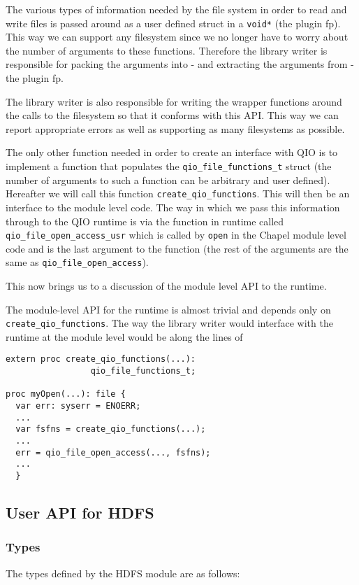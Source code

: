 The various types of information needed by the file system in order to read and write
files is passed around as a user defined struct in a {\tt void*} (the plugin fp). This way we can support
any filesystem since we no longer have to worry about the number of
arguments to these functions. Therefore the library writer is responsible for packing
the arguments into - and extracting the arguments from - the plugin fp. 

The library writer is also responsible for writing the wrapper functions
around the calls to the filesystem so that it conforms with this API.
This way we can report appropriate errors as well as supporting as many
filesystems as possible.

The only other function needed in order to create an interface with QIO is to
implement a function that populates the {\tt qio\_file\_functions\_t} struct (the number of
arguments to such a function can be arbitrary and user defined). Hereafter we will
call this function {\tt create\_qio\_functions}. This will then be an
interface to the module level code. The way in which we pass this information through to the QIO runtime is via the function
in runtime called {\tt qio\_file\_open\_access\_usr} which is called by {\tt open} in the Chapel
module level code and is the last argument to the function
(the rest of the arguments are the same as {\tt qio\_file\_open\_access}). 

This now brings us to a discussion of the module level API to the runtime.

The module-level API for the runtime is almost trivial and depends only on
{\tt create\_qio\_functions}. The way the library writer would interface with the runtime 
at the module level would be along the lines of 
\begin{lstlisting}
extern proc create_qio_functions(...):
                 qio_file_functions_t;

proc myOpen(...): file {
  var err: syserr = ENOERR;
  ...
  var fsfns = create_qio_functions(...);
  ...
  err = qio_file_open_access(..., fsfns);
  ...
  }
\end{lstlisting}

\subsection{User API for HDFS}
\subsubsection{Types}
The types defined by the HDFS module are as follows:

